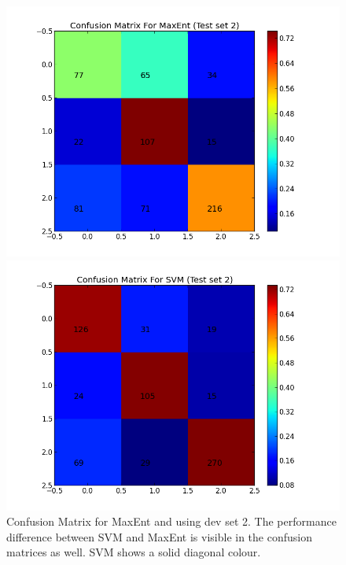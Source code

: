 \begin{figure}[!htb]
	\centering
	\begin{minipage}{.45\linewidth}
		\includegraphics[width=\linewidth]{../img/plots/analysis/maxent_confusion_matrix_best_diff_test.png}
	\end{minipage}
	\hspace{0.05\linewidth}
	\begin{minipage}{.45\linewidth}
		\includegraphics[width=\linewidth]{../img/plots/analysis/svm_confusion_matrix_best_diff_test.png}
	\end{minipage}
	\caption[Confusion Matrix for MaxEnt and SVM using dev set 2]{Confusion Matrix for MaxEnt and  using dev set 2. The performance difference between SVM and MaxEnt is visible in the confusion matrices as well. SVM shows a solid diagonal colour.}
	\label{fig:best_result_confusion_testset2}
\end{figure}

